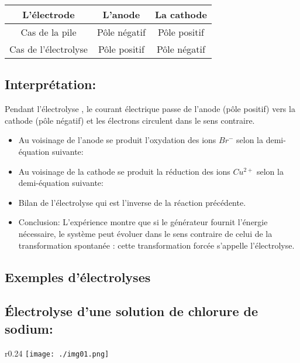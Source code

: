 \documentclass[12pt]{article}
\begin{document}
\begin{center}
\begin{tabular}{ c c c }
 L'électrode & L'anode & La cathode \\\hline
 Cas de la pile & Pôle négatif & Pôle positif\\\hline  
 Cas de l'électrolyse & Pôle positif & Pôle négatif\\\hline    
\end{tabular}
\end{center}


\subsection{Interprétation: }

Pendant l'électrolyse , le courant électrique passe de l'anode (pôle positif) vers la cathode (pôle négatif) et les électrons
circulent dans le sens contraire.

\begin{itemize}

	\item Au voisinage de l'anode se produit l'oxydation des ions $Br^-$ selon la demi-équation suivante:


	\item Au voisinage de la cathode se produit la réduction des ions $Cu^{2+}$ selon la demi-équation suivante:


	\item Bilan de l'électrolyse 	
 qui est l'inverse de la réaction précédente.

\item Conclusion: L'expérience montre que si le générateur fournit l'énergie nécessaire, le système peut évoluer
dans le sens contraire de celui de la transformation spontanée : cette transformation forcée s'appelle l'électrolyse.

\end{itemize}


\subsection{Exemples d'électrolyses}
\subsection{Électrolyse d'une solution de chlorure de sodium: }
\begin{wrapfigure}[1]{r}{0.24\textwidth}
	\vspace{-4cm}
	\texttt{[image: ./img01.png]}
\end{wrapfigure}
\end{document}
